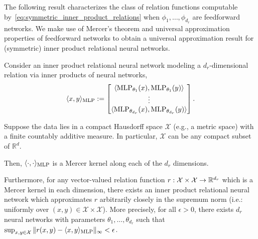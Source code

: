 The following result characterizes the class of relation functions computable by~\eqref{eq:symmetric_inner_product_relations} when \(\phi_{1}, \ldots, \phi_{d_r}\) are feedforward networks. We make use of Mercer's theorem and universal approximation properties of feedforward networks to obtain a universal approximation result for (symmetric) inner product relational neural networks.


\begin{thm}
	\label{theorem:function_class_inner_product_relnn}
	\hphantom{~}

	Consider an inner product relational neural network modeling a \(d_r\)-dimensional relation via inner products of neural networks,
	\begin{equation*}
		\langle x, y \rangle_{\MLP} := \begin{bmatrix}\langle \MLP_{\theta_1}(x), \MLP_{\theta_1}(y) \rangle \\ \vdots \\ \langle \MLP_{\theta_{d_r}}(x), \MLP_{\theta_{d_r}}(y) \rangle\end{bmatrix}.
	\end{equation*}

	Suppose the data lies in a compact Hausdorff space \(\mathcal{X}\) (e.g., a metric space) with a finite countably additive measure. In particular, \(\mathcal{X}\) can be any compact subset of \(\mathbb{R}^d\).

	Then, \(\langle \cdot, \cdot \rangle_{\text{MLP}}\) is a Mercer kernel along each of the \(d_r\) dimensions.

	Furthermore, for any vector-valued relation function \(r: \mathcal{X} \times \mathcal{X} \to \mathbb{R}^{d_r}\) which is a Mercer kernel in each dimension, there exists an inner product relational neural network which approximates \(r\) arbitrarily closely in the supremum norm (i.e.: uniformly over \((x,y) \in \mathcal{X}\times\mathcal{X}\)). More precisely, for all \(\epsilon > 0\), there exists \(d_r\) neural networks with parameters \(\theta_1, \ldots, \theta_{d_r}\) such that \(\sup_{x,y \in \mathcal{X}}{\lVert r(x,y) - \langle x, y \rangle_{\text{MLP}} \rVert_\infty} < \epsilon\).
\end{thm}

